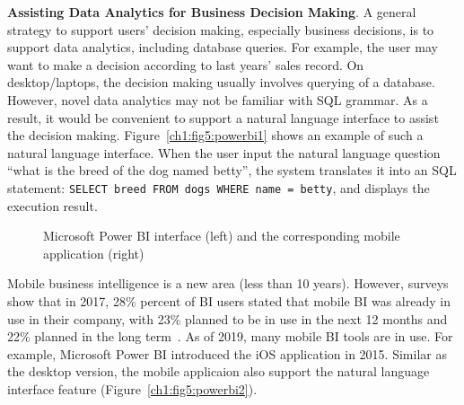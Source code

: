 \textbf{Assisting Data Analytics for Business Decision Making}. A general strategy to support users' decision making, especially business decisions, is to support data analytics, including database queries. For example, the user may want to make a decision according to last years' sales record. On desktop/laptops, the decision making usually involves querying of a database. However, novel data analytics may not be familiar with SQL grammar. As a result, it would be convenient to support a natural language interface to assist the decision making. Figure~\ref{ch1:fig5:powerbi1} shows an example of such a natural language interface. When the user input the natural language question ``what is the breed of the dog named betty'', the system translates it into an SQL statement: \texttt{SELECT breed FROM dogs WHERE name = betty}, and displays the execution result. 

\begin{figure}[h]
\centering
{} \hskip 40pt
\caption{Microsoft Power BI interface (left) and the corresponding mobile application (right)}
\end{figure}

Mobile business intelligence is a new area (less than 10 years). However, surveys show that in 2017, 28\% percent of BI users stated that mobile BI was already in use in their company, with 23\% planned to be in use in the next 12 months and 22\% planned in the long term~\cite{mobilebi}. As of 2019, many mobile BI tools are in use. For example, Microsoft Power BI introduced the iOS application in 2015. Similar as the desktop version, the mobile applicaion also support the natural language interface feature (Figure~\ref{ch1:fig5:powerbi2}). 

